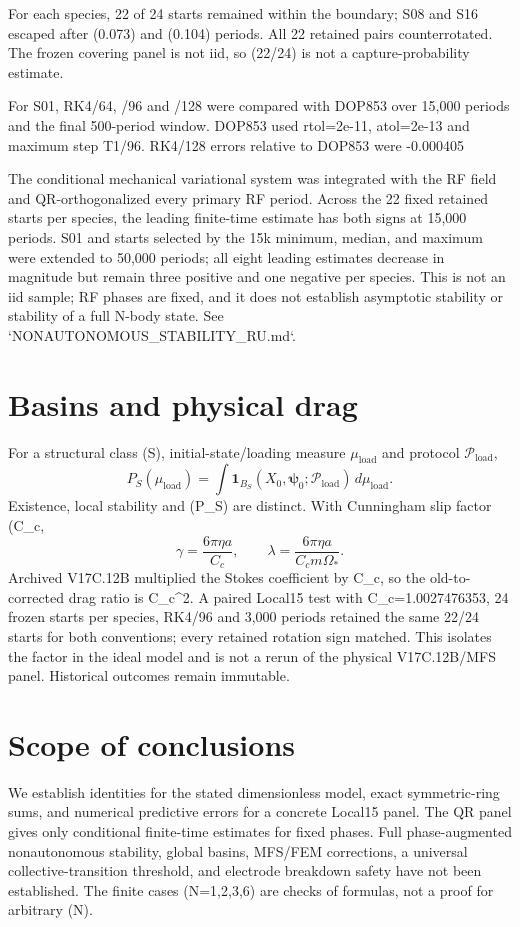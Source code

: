 \documentclass[11pt,a4paper]{article}
\begin{document}
For each species, 22 of 24 starts remained within the boundary; S08 and S16 escaped after (0.073) and (0.104) periods. All 22 retained pairs counterrotated. The frozen covering panel is not iid, so (22/24) is not a capture-probability estimate.

For S01, RK4/64, /96 and /128 were compared with DOP853 over 15,000 periods and the final 500-period window. DOP853 used rtol=2e-11, atol=2e-13 and maximum step T1/96. RK4/128 errors relative to DOP853 were -0.000405%

The conditional mechanical variational system was integrated with the RF field and QR-orthogonalized every primary RF period. Across the 22 fixed retained starts per species, the leading finite-time estimate has both signs at 15,000 periods. S01 and starts selected by the 15k minimum, median, and maximum were extended to 50,000 periods; all eight leading estimates decrease in magnitude but remain three positive and one negative per species. This is not an iid sample; RF phases are fixed, and it does not establish asymptotic stability or stability of a full N-body state. See `NONAUTONOMOUS_STABILITY_RU.md`.

\section{Basins and physical drag}
For a structural class (S), initial-state/loading measure \(\mu_\mathrm{load}\) and protocol \(\mathcal P_\mathrm{load}\),
\[
P_S(\mu_\mathrm{load})=\int\mathbf 1_{B_S}(X_0,\boldsymbol\psi_0;\mathcal P_\mathrm{load})\,d\mu_\mathrm{load}.
\]
Existence, local stability and (P_S) are distinct. With Cunningham slip factor (C_c\),
\[
\gamma=\frac{6\pi\eta a}{C_c},\qquad
\lambda=\frac{6\pi\eta a}{C_cm\Omega_*}.
\]
Archived V17C.12B multiplied the Stokes coefficient by C_c, so the old-to-corrected drag ratio is C_c^2. A paired Local15 test with C_c=1.0027476353, 24 frozen starts per species, RK4/96 and 3,000 periods retained the same 22/24 starts for both conventions; every retained rotation sign matched. This isolates the factor in the ideal model and is not a rerun of the physical V17C.12B/MFS panel. Historical outcomes remain immutable.

\section{Scope of conclusions}
We establish identities for the stated dimensionless model, exact symmetric-ring sums, and numerical predictive errors for a concrete Local15 panel. The QR panel gives only conditional finite-time estimates for fixed phases. Full phase-augmented nonautonomous stability, global basins, MFS/FEM corrections, a universal collective-transition threshold, and electrode breakdown safety have not been established. The finite cases (N=1,2,3,6) are checks of formulas, not a proof for arbitrary (N).
\end{document}
